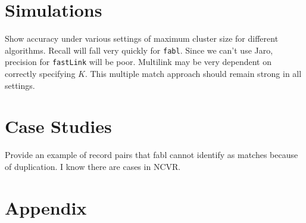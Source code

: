 \documentclass[12pt,letterpaper]{article}
\newcommand{\1}[1]{\mathbb{I}\!\left[#1\right]} %
\begin{document}

%
%

\section{Simulations}
Show accuracy under various settings of maximum cluster size for different algorithms. Recall will fall very quickly for \texttt{fabl}. Since we can't use Jaro, precision for \texttt{fastLink} will be poor.  Multilink may be very dependent on correctly specifying $K$. This multiple match approach should remain strong in all settings. 
\section{Case Studies}

 Provide an example of record pairs that fabl cannot identify as matches because of duplication. I know there are cases in NCVR.




\section{Appendix}
\label{sec:appendix}
\end{document}
